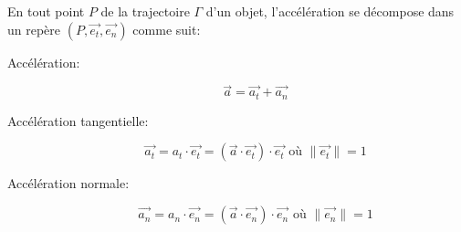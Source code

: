 \documentclass[
    11pt,
    a4paper,
    oneside,
    headinlcude, footinclude,
    twoside,
]{report}
\renewcommand{\vec}[1]{\overrightarrow{#1}}
\begin{document}
En tout point $P$ de la trajectoire $\Gamma$ d'un objet, l'accélération se
décompose dans un repère $(P, \vec{e_{t}}, \vec{e_{n}})$ comme suit:

\begin{center}
    \begin{minipage}{.5\linewidth}
    \end{minipage}
    \begin{minipage}{.49\linewidth}
        \setlength{\parskip}{.3em}
        \begin{description}
            \item[Accélération:]  
                \begin{equation}
                    \label{eq:3.51}
                    \vec a = \vec{a_{t}} + \vec{a_{n}}
                \end{equation}
            \item[Accélération tangentielle:] 
                $$\vec{a_{t}} = a_{t} \cdot \vec{e_{t}} = (\vec a \cdot \vec{e_{t}})
                \cdot \vec{e_{t}} \text{ où } \|\vec{e_{t}}\| = 1$$

            \item[Accélération normale:] 
                $$\vec{a_{n}} = a_{n} \cdot \vec{e_{n}} = (\vec a \cdot \vec{e_{n}})
                \cdot \vec{e_{n}} \text{ où } \|\vec{e_{n}}\| = 1$$
        \end{description}
    \end{minipage}
\end{center}
\end{document}

